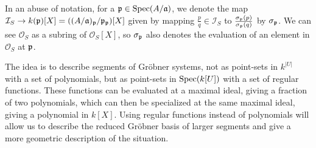 In an abuse of notation, for a $\mathfrak p \in \operatorname{Spec}(A/\mathfrak{a})$, we denote the map $\mathcal I_{S} \to k(\mathfrak p)[X] = ((A/\mathfrak{a})_{\mathfrak p}/\mathfrak p_{\mathfrak p})[X]$ given by mapping $\frac p q \in \mathcal I_{S}$ to $\frac{\sigma_{\mathfrak p}(p)}{\sigma_{\mathfrak p}(q)}$ by $\sigma_{\mathfrak p}$. We can see $\mathcal O_{S}$ as a subring of $\mathcal O_{S}[X]$, so $\sigma_{\mathfrak p}$ also denotes the evaluation of an element in $\mathcal O_{S}$ at $\mathfrak p$.

The idea is to describe segments of Gröbner systems, not as point-sets in $k^{|U|}$ with a set of polynomials, but as point-sets in $\operatorname{Spec}(k[U])$ with a set of regular functions. These functions can be evaluated at a maximal ideal, giving a fraction of two polynomials, which can then be specialized at the same maximal ideal, giving a polynomial in $k[X]$. Using regular functions instead of polynomials will allow us to describe the reduced Gröbner basis of larger segments and give a more geometric description of the situation.

